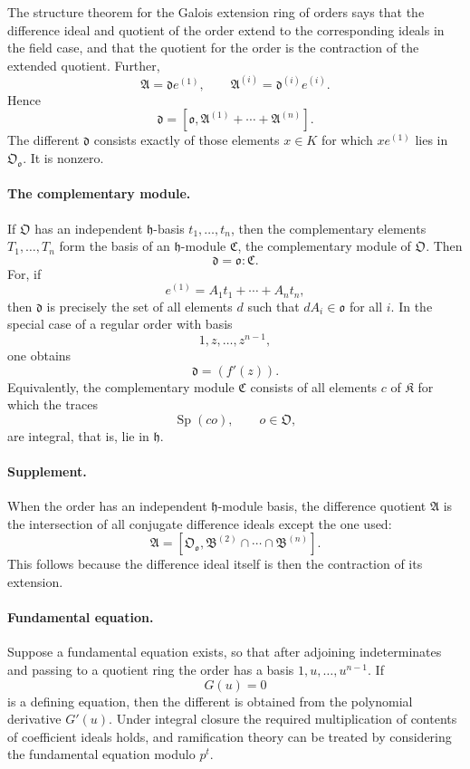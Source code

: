 \documentclass[11pt]{article}
\begin{document}
The structure theorem for the Galois extension ring of orders says that the difference ideal and quotient of the order extend to the corresponding ideals in the field case, and that the quotient for the order is the contraction of the extended quotient. Further,
\[
        \mathfrak A=\mathfrak d e^{(1)},
        \qquad
        \mathfrak A^{(i)}=\mathfrak d^{(i)}e^{(i)}.
\]
Hence
\[
        \mathfrak d=[\mathfrak o,
        \mathfrak A^{(1)}+
        \cdots+\mathfrak A^{(n)}].
\]
The different $\mathfrak d$ consists exactly of those elements $x\in K$ for which $xe^{(1)}$ lies in $\mathfrak O_{\mathfrak o}$. It is nonzero.

\paragraph{The complementary module.}
If $\mathfrak O$ has an independent $\mathfrak h$-basis $t_1,\ldots,t_n$, then the complementary elements $T_1,\ldots,T_n$ form the basis of an $\mathfrak h$-module $\mathfrak C$, the complementary module of $\mathfrak O$. Then
\[
        \mathfrak d=\mathfrak o:\mathfrak C.
\]
For, if
\[
        e^{(1)}=A_1t_1+
        \cdots+A_nt_n,
\]
then $\mathfrak d$ is precisely the set of all elements $d$ such that $dA_i\in\mathfrak o$ for all $i$. In the special case of a regular order with basis
\[
        1,z,\ldots,z^{n-1},
\]
one obtains
\[
        \mathfrak d=(f'(z)).
\]
Equivalently, the complementary module $\mathfrak C$ consists of all elements $c$ of $\mathfrak K$ for which the traces
\[
        \operatorname{Sp}(co),\qquad o\in\mathfrak O,
\]
are integral, that is, lie in $\mathfrak h$.

\paragraph{Supplement.}
When the order has an independent $\mathfrak h$-module basis, the difference quotient $\mathfrak A$ is the intersection of all conjugate difference ideals except the one used:
\[
        \mathfrak A=[\mathfrak O_{\mathfrak o},
        \mathfrak B^{(2)}\cap\cdots\cap\mathfrak B^{(n)}].
\]
This follows because the difference ideal itself is then the contraction of its extension.

\paragraph{Fundamental equation.}
Suppose a fundamental equation exists, so that after adjoining indeterminates and passing to a quotient ring the order has a basis $1,u,\ldots,u^{n-1}$. If
\[
        G(u)=0
\]
is a defining equation, then the different is obtained from the polynomial derivative $G'(u)$. Under integral closure the required multiplication of contents of coefficient ideals holds, and ramification theory can be treated by considering the fundamental equation modulo $p^t$.
\end{document}
